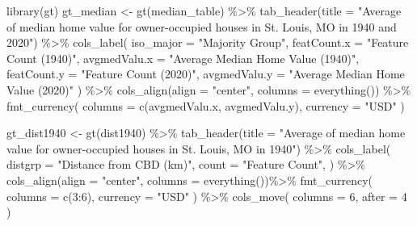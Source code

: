 \documentclass[
]{article}
\newenvironment{Shaded}{\begin{snugshade}}{\end{snugshade}}
\newcommand{\AttributeTok}[1]{\textcolor[rgb]{0.77,0.63,0.00}{#1}}
\newcommand{\DecValTok}[1]{\textcolor[rgb]{0.00,0.00,0.81}{#1}}
\newcommand{\FunctionTok}[1]{\textcolor[rgb]{0.00,0.00,0.00}{#1}}
\newcommand{\NormalTok}[1]{#1}
\newcommand{\OtherTok}[1]{\textcolor[rgb]{0.56,0.35,0.01}{#1}}
\newcommand{\SpecialCharTok}[1]{\textcolor[rgb]{0.00,0.00,0.00}{#1}}
\newcommand{\StringTok}[1]{\textcolor[rgb]{0.31,0.60,0.02}{#1}}
\begin{document}
\begin{Shaded}
\begin{Highlighting}[]
\FunctionTok{library}\NormalTok{(gt)}
\NormalTok{gt\_median }\OtherTok{\textless{}{-}} \FunctionTok{gt}\NormalTok{(median\_table) }\SpecialCharTok{\%\textgreater{}\%}
  \FunctionTok{tab\_header}\NormalTok{(}\AttributeTok{title =} \StringTok{"Average of median home value for owner{-}occupied houses in St. Louis, MO in 1940 and 2020"}\NormalTok{) }\SpecialCharTok{\%\textgreater{}\%}
  \FunctionTok{cols\_label}\NormalTok{(}
    \AttributeTok{iso\_major =} \StringTok{"Majority Group"}\NormalTok{,}
    \AttributeTok{featCount.x =} \StringTok{"Feature Count (1940)"}\NormalTok{,}
    \AttributeTok{avgmedValu.x =} \StringTok{"Average Median Home Value (1940)"}\NormalTok{, }
    \AttributeTok{featCount.y =} \StringTok{"Feature Count (2020)"}\NormalTok{, }
    \AttributeTok{avgmedValu.y =} \StringTok{"Average Median Home Value (2020)"}
\NormalTok{  ) }\SpecialCharTok{\%\textgreater{}\%}
  \FunctionTok{cols\_align}\NormalTok{(}\AttributeTok{align =} \StringTok{"center"}\NormalTok{, }\AttributeTok{columns =} \FunctionTok{everything}\NormalTok{()) }\SpecialCharTok{\%\textgreater{}\%}
  \FunctionTok{fmt\_currency}\NormalTok{(}
    \AttributeTok{columns =} \FunctionTok{c}\NormalTok{(avgmedValu.x, avgmedValu.y),}
    \AttributeTok{currency =} \StringTok{"USD"}
\NormalTok{  )}

\NormalTok{gt\_dist1940 }\OtherTok{\textless{}{-}} \FunctionTok{gt}\NormalTok{(dist1940) }\SpecialCharTok{\%\textgreater{}\%}
  \FunctionTok{tab\_header}\NormalTok{(}\AttributeTok{title =} \StringTok{"Average of median home value for owner{-}occupied houses in St. Louis, MO in 1940"}\NormalTok{) }\SpecialCharTok{\%\textgreater{}\%}
  \FunctionTok{cols\_label}\NormalTok{(}
    \AttributeTok{distgrp =} \StringTok{"Distance from CBD (km)"}\NormalTok{,}
    \AttributeTok{count =} \StringTok{"Feature Count"}\NormalTok{,}
\NormalTok{  ) }\SpecialCharTok{\%\textgreater{}\%}
  \FunctionTok{cols\_align}\NormalTok{(}\AttributeTok{align =} \StringTok{"center"}\NormalTok{, }\AttributeTok{columns =} \FunctionTok{everything}\NormalTok{())}\SpecialCharTok{\%\textgreater{}\%}
  \FunctionTok{fmt\_currency}\NormalTok{(}
    \AttributeTok{columns =} \FunctionTok{c}\NormalTok{(}\DecValTok{3}\SpecialCharTok{:}\DecValTok{6}\NormalTok{),}
    \AttributeTok{currency =} \StringTok{"USD"}
\NormalTok{  ) }\SpecialCharTok{\%\textgreater{}\%}
  \FunctionTok{cols\_move}\NormalTok{(}
    \AttributeTok{columns =} \DecValTok{6}\NormalTok{,}
    \AttributeTok{after =} \DecValTok{4}
\NormalTok{  )}


\end{Highlighting}
\end{Shaded}
\end{document}
